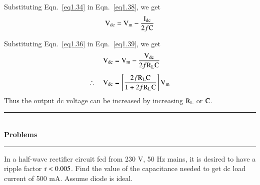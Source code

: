 Substituting Eqn.~\eqref{eq1.34} in Eqn.~\eqref{eq1.38}, we get
\begin{equation}
\textrm{V}_{\text{dc}}=\textrm{V}_{\textrm{m}}-\dfrac{\textrm{I}_{\text{dc}}}{2f\textrm{C}}\label{eq1.39}
\end{equation}

Substituting Eqn.~\eqref{eq1.36} in Eqn.~\eqref{eq1.39}, we get
\begin{align}
\textrm{V}_{\text{dc}} &= \textrm{V}_{\textrm{m}}-\dfrac{\textrm{V}_{\text{dc}}}{2f\textrm{R}_{\textrm{L}}\textrm{C}}\notag\\[4pt]
\therefore\quad \textrm{V}_{\text{dc}} &= \left[\frac{2f\textrm{R}_{\textrm{L}}\textrm{C}}{1+2f\textrm{R}_{\textrm{L}}\textrm{C}}\right]\textrm{V}_{\textrm{m}}\label{eq1.40}
\end{align}
Thus the output dc voltage can be increased by increasing $\textrm{R}_{\textrm{L}}$ or $\textrm{C}$.

\begin{center}
\rule{4cm}{1pt}\\
{\bf\Large Problems}\\[-3pt]
\rule{4cm}{1pt}
\end{center}

\begin{problem}\label{prob1.17}
In a half-wave rectifier circuit fed from 230 V, 50 Hz mains, it is desired to have a ripple factor $\textrm{r}<0.005$. Find the value of the capacitance needed to get dc load current of 500 mA. Assume diode is ideal.
\end{problem}

